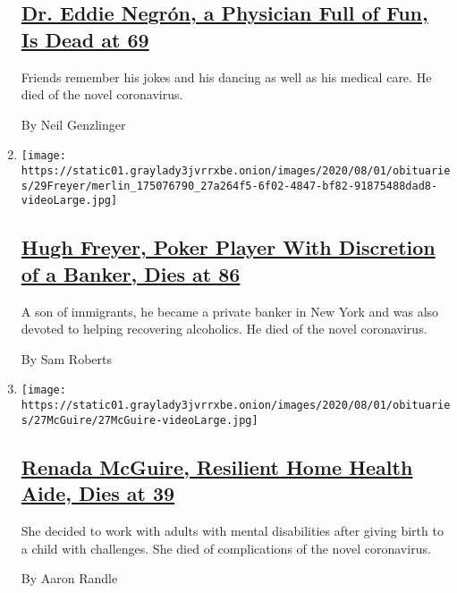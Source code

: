 \begin{enumerate}
{  \subsection{\texorpdfstring{\href{/2020/08/01/obituaries/eddie-negron-dead-coronavirus.html}{Dr.
  Eddie Negrón, a Physician Full of Fun, Is Dead at
  69}}{Dr. Eddie Negrón, a Physician Full of Fun, Is Dead at 69}}\label{dr-eddie-negruxf3n-a-physician-full-of-fun-is-dead-at-69}}

  Friends remember his jokes and his dancing as well as his medical
  care. He died of the novel coronavirus.

  By Neil Genzlinger
\item
  \texttt{[image: https://static01.graylady3jvrrxbe.onion/images/2020/08/01/obituaries/29Freyer/merlin\_175076790\_27a264f5-6f02-4847-bf82-91875488dad8-videoLarge.jpg]}

  \hypertarget{hugh-freyer-poker-player-with-discretion-of-a-banker-dies-at-86}{%
  \subsection{\texorpdfstring{\href{/2020/07/30/obituaries/hugh-freyer-dead-coronavirus.html}{Hugh
  Freyer, Poker Player With Discretion of a Banker, Dies at
  86}}{Hugh Freyer, Poker Player With Discretion of a Banker, Dies at 86}}\label{hugh-freyer-poker-player-with-discretion-of-a-banker-dies-at-86}}

  A son of immigrants, he became a private banker in New York and was
  also devoted to helping recovering alcoholics. He died of the novel
  coronavirus.

  By Sam Roberts
\item
  \texttt{[image: https://static01.graylady3jvrrxbe.onion/images/2020/08/01/obituaries/27McGuire/27McGuire-videoLarge.jpg]}

  \hypertarget{renada-mcguire-resilient-home-health-aide-dies-at-39}{%
  \subsection{\texorpdfstring{\href{/2020/07/29/obituaries/renada-mcguire-dead-coronavirus.html}{Renada
  McGuire, Resilient Home Health Aide, Dies at
  39}}{Renada McGuire, Resilient Home Health Aide, Dies at 39}}\label{renada-mcguire-resilient-home-health-aide-dies-at-39}}

  She decided to work with adults with mental disabilities after giving
  birth to a child with challenges. She died of complications of the
  novel coronavirus.

  By Aaron Randle
\end{enumerate}

